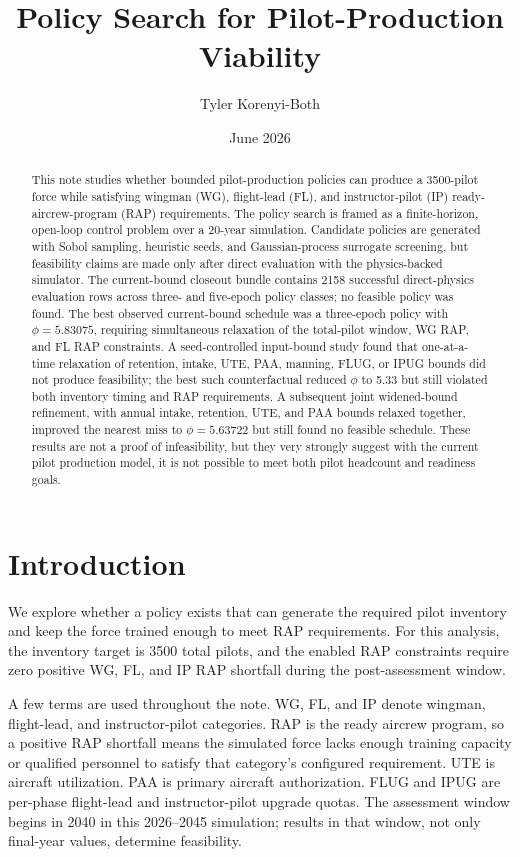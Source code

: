 \documentclass[10pt]{article}
\title{\textbf{Policy Search for Pilot-Production Viability}}
\author{Tyler Korenyi-Both}
\date{June 2026}
\begin{document}
\maketitle

\begin{abstract}
This note studies whether bounded pilot-production policies can produce a
3500-pilot force while satisfying wingman (WG), flight-lead (FL), and
instructor-pilot (IP) ready-aircrew-program (RAP) requirements. The policy
search is framed as a finite-horizon, open-loop control problem over a
20-year simulation. Candidate policies are generated with Sobol sampling,
heuristic seeds, and Gaussian-process surrogate screening, but feasibility
claims are made only after direct evaluation with the physics-backed simulator.
The current-bound closeout bundle contains 2158 successful direct-physics
evaluation rows across three- and five-epoch policy classes; no feasible policy
was found. The best observed current-bound schedule was a three-epoch
policy with $\phi=5.83075$, requiring
simultaneous relaxation of the total-pilot window, WG RAP, and FL RAP
constraints. A seed-controlled input-bound study found that one-at-a-time
relaxation of retention, intake, UTE, PAA, manning, FLUG, or IPUG bounds did
not produce feasibility; the best such counterfactual reduced $\phi$ to 5.33
but still violated both inventory timing and RAP requirements. A subsequent
joint widened-bound refinement, with annual intake, retention, UTE, and PAA
bounds relaxed together, improved the nearest miss to $\phi=5.63722$ but still
found no feasible schedule. These results are not a proof of infeasibility, but
they very strongly suggest with the current pilot production model, it is not
possible to meet both pilot headcount and readiness goals.
\end{abstract}

\section{Introduction}

We explore whether a policy exists that can generate the required
pilot inventory and keep the force trained enough to meet RAP requirements.
For this analysis, the inventory target is 3500 total pilots, and the enabled
RAP constraints require zero positive WG, FL, and IP RAP shortfall during the
post-assessment window.

A few terms are used throughout the note. WG, FL, and IP denote wingman,
flight-lead, and instructor-pilot categories. RAP is the ready aircrew program,
so a positive RAP shortfall means the simulated force lacks enough training
capacity or qualified personnel to satisfy that category's configured
requirement. UTE is aircraft utilization. PAA is primary aircraft authorization.
FLUG and IPUG are per-phase flight-lead and instructor-pilot upgrade quotas.
The assessment window begins in 2040 in this 2026--2045 simulation; results in
that window, not only final-year values, determine feasibility.
\end{document}
